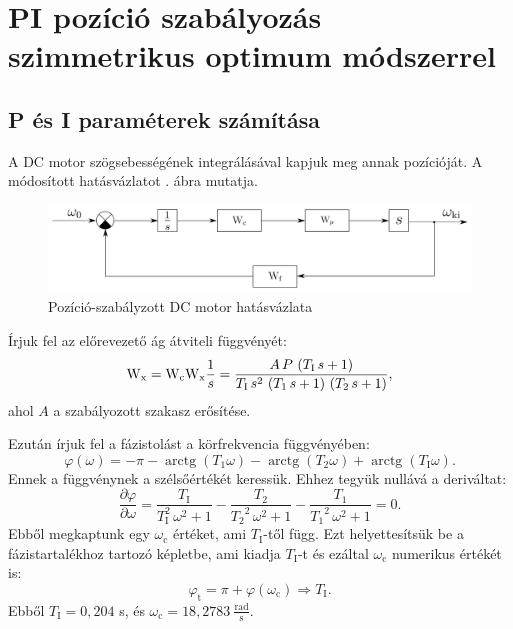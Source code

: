 \section{PI pozíció szabályozás szimmetrikus optimum módszerrel}

\subsection{P és I paraméterek számítása}

A DC motor szögsebességének integrálásával kapjuk meg annak pozícióját.
A módosított hatásvázlatot . ábra mutatja.

\begin{figure}[H]
	\centering
	\includegraphics[width=.7\textwidth]{pi-hatasvazlat-2}
	\caption{Pozíció-szabályzott DC motor hatásvázlata}
	\label{fig:pi-hatasvazlat-2}
\end{figure}

Írjuk fel az előrevezető ág átviteli függvényét:
\begin{equation}
	\mathrm{W}_\text{x} = \mathrm{W}_\text{c}\mathrm{W}_\text{x}\frac{1}{s} = 
	\frac{A\, P\, \left(T_\text{I}\, s + 1\right)}{T_\text{I}\, s^2\, \left(T_1\, s + 1\right)\, \left(T_2\, s + 1\right)},
\end{equation}
ahol $A$ a szabályozott szakasz erősítése.

Ezután írjuk fel a fázistolást a körfrekvencia függvényében:
\begin{equation}
	\varphi(\omega) = -\pi - \operatorname{arctg}(T_1\omega) - \operatorname{arctg}(T_2\omega) + \operatorname{arctg}(T_\text{I}\omega).
\end{equation}
Ennek a függvénynek a szélsőértékét keressük. Ehhez tegyük nullává a deriváltat:
\begin{equation}
	\frac{\partial\varphi}{\partial\omega} = 
	\frac{T_\text{I}}{T_\text{I}^2\, \omega^2 + 1} - \frac{T_2}{{T_2}^2\, \omega^2 + 1} - \frac{T_1}{{T_1}^2\, \omega^2 + 1} = 0.
\end{equation}
Ebből megkaptunk egy $\omega_\text{c}$ értéket, ami $T_\text{I}$-től függ.
Ezt helyettesítsük be a fázistartalékhoz tartozó képletbe, ami kiadja $T_\text{I}$-t és
ezáltal $\omega_\text{c}$ numerikus értékét is:
\begin{equation}
	\varphi_\text{t} = \pi + \varphi(\omega_\text{c}) \Rightarrow T_\text{I}.
\end{equation}
Ebből $T_\text{I} = 0,204$ s, és $\omega_\text{c} = 18,2783~\frac{\text{rad}}{\text{s}}$.

